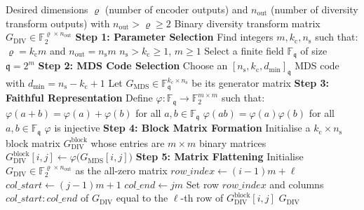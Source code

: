 \documentclass[lettersize,journal]{IEEEtran}
\begin{document}
\begin{algorithm}
\caption{Construction of Diversity Transform Matrix from MDS Codes}
\label{alg:div_transform_construction}
\begin{algorithmic}[1]
\Require Desired dimensions $\varrho$ (number of encoder outputs) 
and $n_{\text{out}}$ (number of diversity transform outputs) with 
$n_{\text{out}} > \varrho \geq 2$
\Ensure Binary diversity transform matrix 
$G_{\text{DIV}} \in \mathbb{F}_{2}^{\varrho \times n_{\text{out}}}$
\Statex
{}
    \State \textbf{Step 1: Parameter Selection}
    \State Find integers $m, k_{\mathrm{c}}, n_{\mathrm{s}}$ such that:
    \State \quad $\varrho = k_{\mathrm{c}} m$ and 
    $n_{\text{out}} = n_{\mathrm{s}} m$
    \State \quad $n_{\mathrm{s}} > k_{\mathrm{c}} \geq 1$, $m \geq 1$
    \State Select a finite field $\mathbb{F}_{\mathfrak{q}}$ of size 
    $\mathfrak{q} = 2^{m}$
    \State \textbf{Step 2: MDS Code Selection}
    \State Choose an $[n_{\mathrm{s}}, k_{\mathrm{c}}, 
    d_{\min}]_{\mathfrak{q}}$ MDS code with 
    $d_{\min} = n_{\mathrm{s}}-k_{\mathrm{c}}+1$
    \State Let $G_{\text{MDS}} \in 
    \mathbb{F}_{\mathfrak{q}}^{k_{\mathrm{c}} \times n_{\mathrm{s}}}$ 
    be its generator matrix
    \State \textbf{Step 3: Faithful Representation}
    \State Define $\varphi: \mathbb{F}_{\mathfrak{q}} \rightarrow 
    \mathbb{F}_{2}^{m \times m}$ such that:
    \State \quad $\varphi(a + b) = \varphi(a) + \varphi(b)$ for all 
    $a,b \in \mathbb{F}_{\mathfrak{q}}$
    \State \quad $\varphi(ab) = \varphi(a)\varphi(b)$ for all 
    $a,b \in \mathbb{F}_{\mathfrak{q}}$
    \State \quad $\varphi$ is injective
    \State \textbf{Step 4: Block Matrix Formation}
    \State Initialise a $k_{\mathrm{c}} \times n_{\mathrm{s}}$ block 
    matrix $G_{\text{DIV}}^{\mathrm{block}}$ whose entries are 
    $m \times m$ binary matrices
            \State $G_{\text{DIV}}^{\mathrm{block}}[i,j] \gets 
            \varphi\bigl(G_{\text{MDS}}[i,j]\bigr)$
        \EndFor
    \EndFor
    \State \textbf{Step 5: Matrix Flattening}
    \State Initialise $G_{\text{DIV}} \in 
    \mathbb{F}_{2}^{\varrho \times n_{\text{out}}}$ as the all-zero 
    matrix
                \State $row\_index \gets (i-1)m + \ell$
                \State $col\_start \gets (j-1)m + 1$
                \State $col\_end \gets j m$
                \State Set row $row\_index$ and columns 
                $col\_start{:}col\_end$ of $G_{\text{DIV}}$ equal 
                to the $\ell$-th row of 
                $G_{\text{DIV}}^{\mathrm{block}}[i,j]$
            \EndFor
        \EndFor
    \EndFor
    \State \Return $G_{\text{DIV}}$
\EndProcedure
\end{algorithmic}
\end{algorithm}
\end{document}
